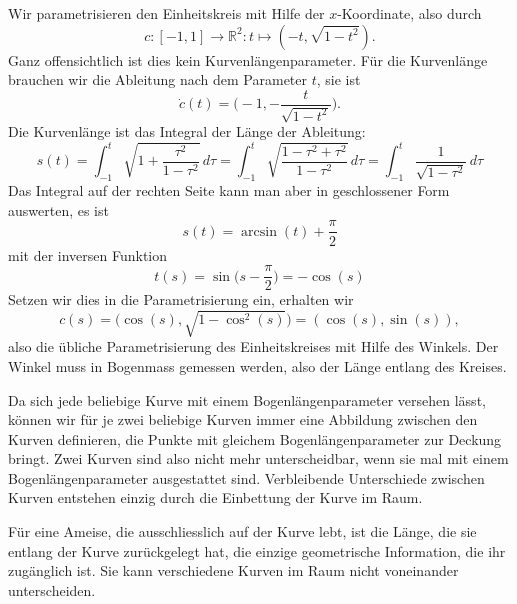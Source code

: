 \begin{beispiel}
Wir parametrisieren den Einheitskreis mit Hilfe der $x$-Koordinate, also
durch
\[
c\colon
[-1,1]\to\mathbb R^2
\colon
t\mapsto (-t,\sqrt{1-t^2}).
\]
Ganz offensichtlich ist dies kein Kurvenlängenparameter.
Für die Kurvenlänge brauchen wir die Ableitung nach dem Parameter $t$,
sie ist
\[
\dot c(t)=\biggl(-1, -\frac{t}{\sqrt{1-t^2}}\biggr).
\]
Die Kurvenlänge ist das Integral der Länge der Ableitung:
\[
s(t)
=
\int_{-1}^t \sqrt{1 + \frac{\tau^2}{1-\tau^2}}\,d\tau
=
\int_{-1}^t \sqrt{\frac{1-\tau^2 +\tau^2}{1-\tau^2}}\,d\tau
=
\int_{-1}^t \frac{1}{\sqrt{1-\tau^2}}\,d\tau
\]
Das Integral auf der rechten Seite kann man aber in geschlossener
Form auswerten, es ist
\[
s(t)=\arcsin(t) + \frac{\pi}{2}
\]
mit der inversen Funktion
\[
t(s)
=
\sin\biggl(s-\frac{\pi}2\biggr)
=
-\cos(s)
\]
Setzen wir dies in die Parametrisierung ein, erhalten wir
\[
c(s)
=
\bigl(\cos(s), \sqrt{1-\cos^2(s)}\bigr)
=
(\cos(s), \sin(s)),
\]
also die übliche Parametrisierung des Einheitskreises mit Hilfe
des Winkels.
Der Winkel muss in Bogenmass gemessen werden, also der Länge entlang
des Kreises.
\end{beispiel}

Da sich jede beliebige Kurve mit einem Bogenlängenparameter versehen
lässt, können wir für je zwei beliebige Kurven immer eine Abbildung
zwischen den Kurven definieren, die Punkte mit gleichem Bogenlängenparameter
zur Deckung bringt.
Zwei Kurven sind also nicht mehr unterscheidbar, wenn sie mal mit
einem Bogenlängenparameter ausgestattet sind.
Verbleibende Unterschiede zwischen Kurven entstehen einzig durch die
Einbettung der Kurve im Raum.

Für eine Ameise, die ausschliesslich auf der Kurve lebt, ist die Länge,
die sie entlang der Kurve zurückgelegt hat, die einzige geometrische
Information, die ihr zugänglich ist.
Sie kann verschiedene Kurven im Raum nicht voneinander unterscheiden.

